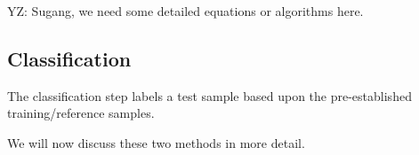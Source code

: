 YZ: Sugang, we need some detailed equations or algorithms here.
\fi

\subsection{Classification}
The classification step labels a test sample based upon the pre-established training/reference samples.
%

\iffalse
We will now discuss these two methods in more detail.

